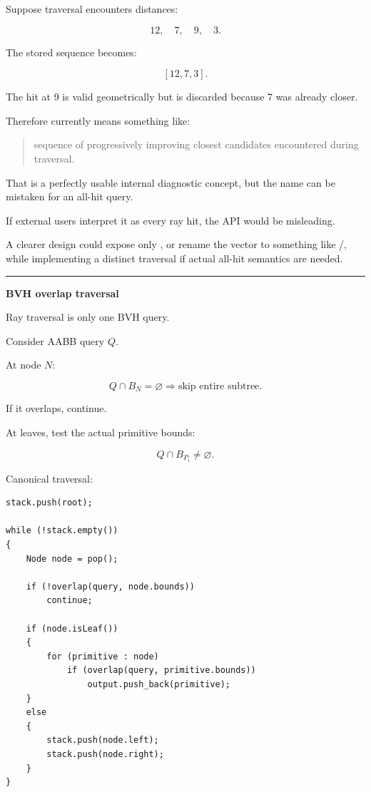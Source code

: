 Suppose traversal encounters distances:

\[
12,\quad 7,\quad 9,\quad 3.
\]

The stored sequence becomes:

\[
[12,7,3].
\]

The hit at 9 is valid geometrically but is discarded because 7 was already closer.

Therefore  currently means something like:

\begin{quote}
sequence of progressively improving closest candidates encountered during traversal.
\end{quote}

That is a perfectly usable internal diagnostic concept, but the name  can be mistaken for an all-hit query.

If external users interpret it as every ray hit, the API would be misleading.

A clearer design could expose only , or rename the vector to something like /, while implementing a distinct  traversal if actual all-hit semantics are needed.

\begin{center}\rule{0.5\linewidth}{0.5pt}\end{center}

\textbf{BVH overlap traversal}

Ray traversal is only one BVH query.

Consider AABB query \(Q\).

At node \(N\):

\[
Q\cap B_N=\varnothing
\Rightarrow
\text{skip entire subtree}.
\]

If it overlaps, continue.

At leaves, test the actual primitive bounds:

\[
Q\cap B_{P_i}\ne\varnothing.
\]

Canonical traversal:

\begin{verbatim}
stack.push(root);

while (!stack.empty())
{
    Node node = pop();

    if (!overlap(query, node.bounds))
        continue;

    if (node.isLeaf())
    {
        for (primitive : node)
            if (overlap(query, primitive.bounds))
                output.push_back(primitive);
    }
    else
    {
        stack.push(node.left);
        stack.push(node.right);
    }
}
\end{verbatim}

